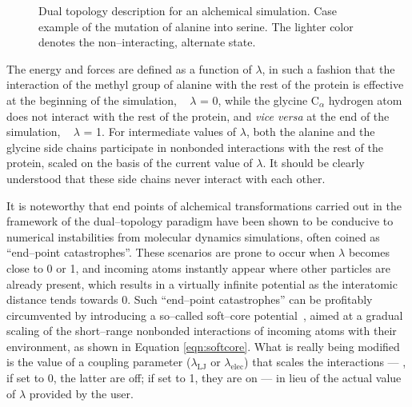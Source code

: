 \begin{figure}[ht]
  \caption{Dual topology description for an alchemical simulation.
           Case example of the mutation of alanine into serine.
           The lighter color denotes the non--interacting, alternate
           state.
           \label{fig:dual_top}}
\end{figure}


The energy and forces are defined as a function of $\lambda$, in such a fashion
that the interaction of the methyl group of alanine with the rest of the
protein is effective at the beginning of the simulation, \ie~ $\lambda$ = 0,
while the glycine C$_\alpha$ hydrogen atom does not interact with the rest of
the protein, and {\it vice versa} at the end of the simulation, \ie~ $\lambda$
= 1. For intermediate values of $\lambda$, both the alanine and the glycine
side chains participate in nonbonded interactions with the rest of the protein,
scaled on the basis of the current value of $\lambda$. It should be clearly
understood that these side chains never interact with each other.


It is noteworthy that end points of alchemical transformations carried out in the framework of the dual--topology paradigm have been shown to be conducive to
numerical instabilities from molecular dynamics simulations, often coined as ``end--point
catastrophes''. These scenarios are prone to occur when $\lambda$ becomes close
to 0 or 1, and incoming atoms instantly appear where other particles are
already present, which results in a virtually infinite potential as the
interatomic distance tends towards 0. Such ``end--point catastrophes'' can be
profitably circumvented by introducing a so--called soft--core
potential~\cite{Beutler1994,Zacharias1994}, aimed at a gradual scaling of the short--range
nonbonded interactions of incoming atoms with their environment, as shown in Equation \ref{eqn:softcore}.  
What is really being modified is the value of a coupling parameter ($\lambda_\mathrm{LJ}$ or $\lambda_\mathrm{elec}$) that
scales the interactions --- \ie, if set to 0, the latter are off; if set to 1,
they are on --- in lieu of the actual value of $\lambda$ provided by the user.  

